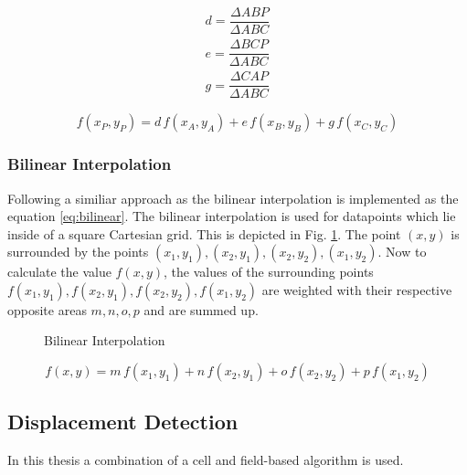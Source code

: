 \documentclass[11pt,twoside,a4paper,fleqn]{report}
\numberwithin{equation}{chapter}
\numberwithin{figure}{chapter}
\numberwithin{table}{chapter}
\begin{document}
\begin{equation}
	\begin{aligned}
		d = \dfrac{\Delta ABP}{\Delta ABC}\\
		e = \dfrac{\Delta BCP}{\Delta ABC}\\
		g = \dfrac{\Delta CAP}{\Delta ABC}
	\end{aligned}
	\label{eq:barycor}
\end{equation}

\begin{equation}
f(x_P,y_P) = d\,f(x_A,y_A)+e\,f(x_B,y_B)+g\,f(x_C,y_C)
\label{eq:baryeq}
\end{equation}

\subsubsection{Bilinear Interpolation}
Following a similiar approach as \cite{bilinear} the bilinear interpolation is implemented as the equation \ref{eq:bilinear}. The bilinear interpolation is used for datapoints which lie inside of a square Cartesian grid. This is depicted in Fig. \ref{fig:bilinear}. The point $(x,y)$ is surrounded by the points $(x_1,y_1),(x_2,y_1),(x_2,y_2),(x_1,y_2)$. Now to calculate the value $f(x,y)$, the values of the surrounding points $f(x_1,y_1),f(x_2,y_1),f(x_2,y_2),f(x_1,y_2)$ are weighted with their respective opposite areas $m,n,o,p $ and are summed up. 


\begin{figure}[H]
	\centering
	\caption{Bilinear Interpolation}
	\label{fig:bilinear}	
\end{figure}

\begin{equation}
	f(x,y) = m\,f(x_1,y_1)+n\,f(x_2,y_1)+o\,f(x_2,y_2)+p\,f(x_1,y_2)
	\label{eq:bilinear}
\end{equation}
\subsection{Displacement Detection}
In this thesis a combination of a cell and field-based algorithm is used.
\end{document}
